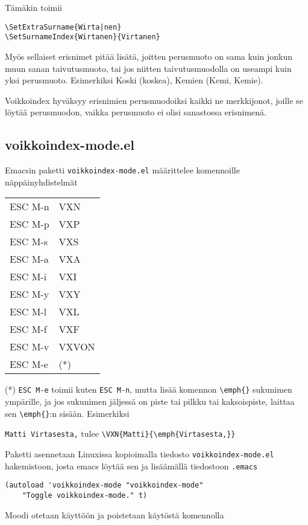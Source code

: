 \documentclass[12pt]{article}
\begin{document}
Tämäkin toimii

\begin{verbatim}
\SetExtraSurname{Wirta|nen}
\SetSurnameIndex{Wirtanen}{Virtanen}
\end{verbatim}

Myös sellaiset erisnimet pitää lisätä, joitten perusmuoto on sama kuin
jonkun muun sanan taivutusmuoto, tai jos niitten taivutusmuodolla on
useampi kuin yksi perusmuoto. Esimerkiksi Koski (koskea), Kemien
(Kemi, Kemie).

Voikkoindex hyväksyy erisnimien perusmuodoiksi kaikki ne merkkijonot,
joille se löytää perusmuodon, vaikka perusmuoto ei olisi sanastossa
erisnimenä.

\newpage
\subsection*{voikkoindex-mode.el}

Emacsin paketti \verb=voikkoindex-mode.el= määrittelee komennoille
näppäinyhdistelmät

\begin{tabular}{@{}ll}
ESC M-n & VXN \\
ESC M-p & VXP \\
ESC M-s & VXS \\
ESC M-a & VXA \\
ESC M-i & VXI \\
ESC M-y & VXY \\
ESC M-l & VXL \\
ESC M-f & VXF \\
ESC M-v & VXVON \\
ESC M-e & (*)
\end{tabular}

(*) \verb=ESC M-e= toimii kuten \verb=ESC M-n=, mutta lisää komennon
\verb=\emph{}= sukunimen ympärille, ja jos sukunimen jäljessä on piste
tai pilkku tai kaksoispiste, laittaa sen \verb=\emph{}=:n sisään.
Esimerkiksi

\verb=Matti Virtasesta,= tulee \verb=\VXN{Matti}{\emph{Virtasesta,}}=

Paketti asennetaan Linuxissa kopioimalla tiedosto
\verb=voikkoindex-mode.el= hakemistoon, josta emacs löytää sen ja
lisäämällä tiedostoon \verb=.emacs=

\begin{verbatim}
(autoload 'voikkoindex-mode "voikkoindex-mode"
    "Toggle voikkoindex-mode." t)
\end{verbatim}

Moodi otetaan käyttöön ja poistetaan käytöstä komennolla
\end{document}
